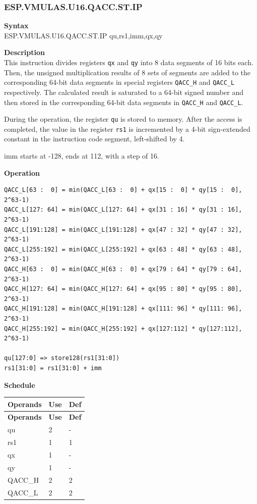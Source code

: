 \newpage
\subsubsection{ESP.VMULAS.U16.QACC.ST.IP}\label{instruction:ESPVMULASU16QACCSTIP}
\textbf{Syntax}\\
ESP.VMULAS.U16.QACC.ST.IP qu,rs1,imm,qx,qy

\textbf{Description}\\
This instruction divides registers \lstinline{qx} and \lstinline{qy} into 8 data segments of 16 bits each. Then, the unsigned multiplication results of 8 sets of segments are added to the corresponding 64-bit data segments in special registers \lstinline{QACC_H} and \lstinline{QACC_L} respectively. The calculated result is saturated to a 64-bit signed number and then stored in the corresponding 64-bit data segments in \lstinline{QACC_H} and \lstinline{QACC_L}.

During the operation, the register \lstinline{qu} is stored to memory. After the access is completed, the value in the register \lstinline{rs1} is incremented by a 4-bit sign-extended constant in the instruction code segment, left-shifted by 4.

imm starts at -128, ends at 112, with a step of 16.

\textbf{Operation}\\
\begin{lstlisting}
QACC_L[63 :  0] = min(QACC_L[63 :  0] + qx[15 :  0] * qy[15 :  0], 2^63-1)
QACC_L[127: 64] = min(QACC_L[127: 64] + qx[31 : 16] * qy[31 : 16], 2^63-1)
QACC_L[191:128] = min(QACC_L[191:128] + qx[47 : 32] * qy[47 : 32], 2^63-1)
QACC_L[255:192] = min(QACC_L[255:192] + qx[63 : 48] * qy[63 : 48], 2^63-1)
QACC_H[63 :  0] = min(QACC_H[63 :  0] + qx[79 : 64] * qy[79 : 64], 2^63-1)
QACC_H[127: 64] = min(QACC_H[127: 64] + qx[95 : 80] * qy[95 : 80], 2^63-1)
QACC_H[191:128] = min(QACC_H[191:128] + qx[111: 96] * qy[111: 96], 2^63-1)
QACC_H[255:192] = min(QACC_H[255:192] + qx[127:112] * qy[127:112], 2^63-1)

qu[127:0] => store128(rs1[31:0])
rs1[31:0] = rs1[31:0] + imm
\end{lstlisting}

\textbf{Schedule}\\
\begin{longtable}[c]{|l|l|l|}
    \hline
    \rowcolor{lightgray}
    \textbf{Operands} & \textbf{Use} & \textbf{Def} \\\hline
    \endfirsthead
    \hline
    \rowcolor{lightgray}
     \textbf{Operands} & \textbf{Use} & \textbf{Def} \\\hline
    \endhead
    \hline
    \endfoot

    qu & 2 & - \\\hline
    rs1 & 1 & 1 \\\hline
     qx & 1 & - \\\hline
     qy & 1 & - \\\hline
     QACC\_H & 2 & 2 \\\hline
     QACC\_L & 2 & 2

\end{longtable}

